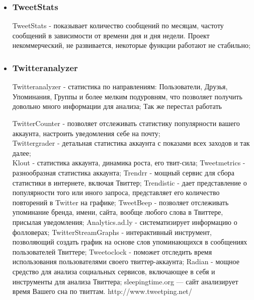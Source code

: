 \begin{chap1}
\begin{itemize}
\item \subsubsection{TweetStats}
TweetStats - показывает количество сообщений по месяцам, частоту сообщений в зависимости от времени дня и дня недели. Проект некоммерческий, не развивается, некоторые функции работают не стабильно;

\item \subsubsection{Twitteranalyzer}
Twitteranalyzer - статистика по  направлениям: Пользователи, Друзья, Упоминания, Группы и более мелким подуровням, что позволяет получить довольно много информации для анализа; Так же перестал работать


TwitterCounter - позволяет отслеживать статистику популярности вашего аккаунта, настроить уведомления себе на почту;\\
Twittergrader - детальная статистика аккаунта с показами всех заходов и так далее;\\
Klout - статистика аккаунта, динамика роста, его твит-сила;
Tweetmetrics - разнообразная статистика аккаунта;
Trendrr - мощный сервис для сбора статистики в интернете, включая Твиттер;
Trendistic - дает представление о популярности того или иного запроса, представляет его количество повторений в Twitter на графике;
TweetBeep - позволяет отслеживать упоминание бренда, имени, сайта, вообще любого слова в Твиттере, присылая уведомления;
Analytics.ad.ly - систематизирует информацию о фолловерах;
TwitterStreamGraphs - интерактивный инструмент, позволяющий создать график на основе слов упоминающихся в сообщениях пользователей Твиттере;
Tweetoclock - поможет отследить время использования пользователями своего твиттер-аккаунта;
Radian - мощное средство для анализа социальных сервисов, включающее в себя и инструменты для анализа Твиттера;
sleepingtime.org — сайт анализирует время Вашего сна по твиттам.
http://www.tweetping.net/
\end{itemize}


\end{chap1}
